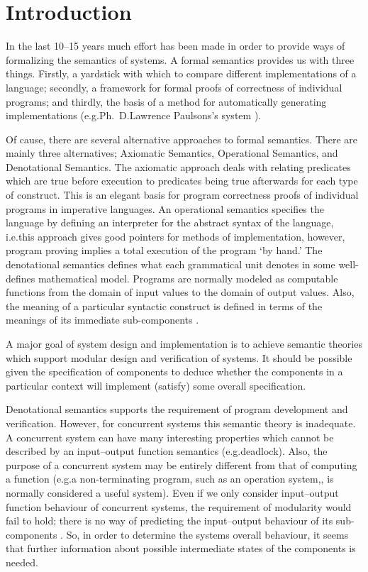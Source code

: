 
\chapter{Introduction}\label{chapIntroduction}

In the last 10--15 years much effort has been made in order to provide ways of formalizing the semantics of systems. A formal semantics provides us with three things. Firstly, a yardstick with which to compare different implementations of a language; secondly, a framework for formal proofs of correctness of individual programs; and thirdly, the basis of a method for automatically generating implementations (e.g.\@ Ph.~D.\@ Lawrence Paulsons's system \cite{Paulson}).

Of cause, there are several alternative approaches to formal semantics. There are mainly three alternatives; Axiomatic Semantics, Operational Semantics, and Denotational Semantics. The axiomatic approach deals with relating predicates which are true before execution to predicates being true afterwards for each type of construct. This is an elegant basis for program correctness proofs of individual programs in imperative languages. An operational semantics specifies the language by defining an interpreter for the abstract syntax of the language, i.e.\@ this approach gives good pointers for methods of implementation, however, program proving implies a total execution of the program `by hand.' The denotational semantics defines what each grammatical unit denotes in some well-defines mathematical model. Programs are normally modeled as computable functions from the domain of input values to the domain of output values. Also, the meaning of a particular syntactic construct is defined in terms of the meanings of its immediate sub-components \cite{Gordon}.

A major goal of system design and implementation is to achieve semantic theories which support modular design and verification of systems. It should be possible given the specification of components to deduce whether the components in a particular context will implement (satisfy) some overall specification.

Denotational semantics supports the requirement of program development and verification. However, for concurrent systems this semantic theory is inadequate. A concurrent system can have many interesting properties which cannot be described by an input--output function semantics (e.g.\@ deadlock). Also, the purpose of a concurrent system may be entirely different from that of computing a function (e.g.\@ a non-terminating program, such as an operation system,, is normally considered a useful system). Even if we only consider input--output function behaviour of concurrent systems, the requirement of modularity would fail to hold; there is no way of predicting the input--output behaviour of its sub-components \cite{Larsen}\cite{Milner}. So, in order to determine the systems overall behaviour,  it seems that further information about possible intermediate states of the components is needed.

